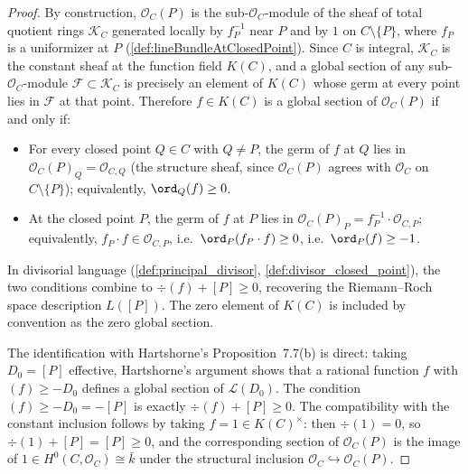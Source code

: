 \begin{proof}
  
  
  
  
  By construction, \(\mathcal O_C(P)\) is the sub-\(\mathcal O_C\)-module of
  the sheaf of total quotient rings \(\mathcal K_C\) generated locally by
  \(f_P^{-1}\) near \(P\) and by \(1\) on \(C \setminus \{P\}\), where \(f_P\) is
  a uniformizer at \(P\) (\cref{def:lineBundleAtClosedPoint}). Since \(C\)
  is integral, \(\mathcal K_C\) is the constant sheaf at the function field
  \(K(C)\), and a global section of any sub-\(\mathcal O_C\)-module
  \(\mathcal F \subset \mathcal K_C\) is precisely an element of \(K(C)\)
  whose germ at every point lies in \(\mathcal F\) at that point.
  Therefore \(f \in K(C)\) is a global section of \(\mathcal O_C(P)\) if
  and only if:

  \begin{itemize}
    \item For every closed point \(Q \in C\) with \(Q \neq P\), the germ of
      \(f\) at \(Q\) lies in \(\mathcal O_C(P)_Q = \mathcal O_{C, Q}\)
      (the structure sheaf, since \(\mathcal O_C(P)\) agrees with
      \(\mathcal O_C\) on \(C \setminus \{P\}\)); equivalently,
      \(\ord_Q(f) \geq 0\).
    \item At the closed point \(P\), the germ of \(f\) at \(P\) lies in
      \(\mathcal O_C(P)_P = f_P^{-1} \cdot \mathcal O_{C, P}\);
      equivalently, \(f_P \cdot f \in \mathcal O_{C, P}\), i.e.\
      \(\ord_P(f_P \cdot f) \geq 0\), i.e.\ \(\ord_P(f) \geq -1\).
  \end{itemize}
  In divisorial language (\cref{def:principal_divisor},
  \cref{def:divisor_closed_point}), the two conditions combine to
  \(\div(f) + [P] \geq 0\), recovering the Riemann--Roch space description
  \(L([P])\). The zero element of \(K(C)\) is included by convention as the
  zero global section.

  The identification with Hartshorne's Proposition~7.7(b) is direct:
  taking \(D_0 = [P]\) effective, Hartshorne's argument shows that a
  rational function \(f\) with \((f) \geq -D_0\) defines a global section
  of \(\mathscr L(D_0)\). The condition \((f) \geq -D_0 = -[P]\) is exactly
  \(\div(f) + [P] \geq 0\). The compatibility with the constant inclusion
  follows by taking \(f = 1 \in K(C)^{\times}\): then \(\div(1) = 0\), so
  \(\div(1) + [P] = [P] \geq 0\), and the corresponding section of
  \(\mathcal O_C(P)\) is the image of $1 \in H^0(C, \mathcal O_C)
  \cong \bar k$ under the structural inclusion $\mathcal O_C
  \hookrightarrow \mathcal O_C(P)$.
\end{proof}

